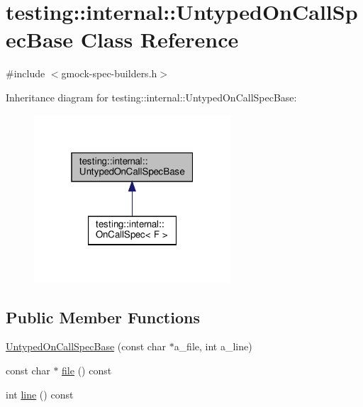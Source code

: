 \hypertarget{classtesting_1_1internal_1_1_untyped_on_call_spec_base}{}\section{testing\+:\+:internal\+:\+:Untyped\+On\+Call\+Spec\+Base Class Reference}
\label{classtesting_1_1internal_1_1_untyped_on_call_spec_base}


{\ttfamily \#include $<$gmock-\/spec-\/builders.\+h$>$}



Inheritance diagram for testing\+:\+:internal\+:\+:Untyped\+On\+Call\+Spec\+Base\+:
\nopagebreak
\begin{figure}[H]
\begin{center}
\leavevmode
\includegraphics[width=208pt]{classtesting_1_1internal_1_1_untyped_on_call_spec_base__inherit__graph}
\end{center}
\end{figure}
\subsection*{Public Member Functions}
\begin{DoxyCompactItemize}
\item 
\hyperlink{classtesting_1_1internal_1_1_untyped_on_call_spec_base_afc5da72d536ad61e2d66de87b2b9bc50}{Untyped\+On\+Call\+Spec\+Base} (const char $\ast$a\+\_\+file, int a\+\_\+line)
\item 
const char $\ast$ \hyperlink{classtesting_1_1internal_1_1_untyped_on_call_spec_base_a5ccb6ee1208ee597528b44c7c9945fa3}{file} () const
\item 
int \hyperlink{classtesting_1_1internal_1_1_untyped_on_call_spec_base_a18e9eb7155380b3e124bccc0d8115b5e}{line} () const
\end{DoxyCompactItemize}

